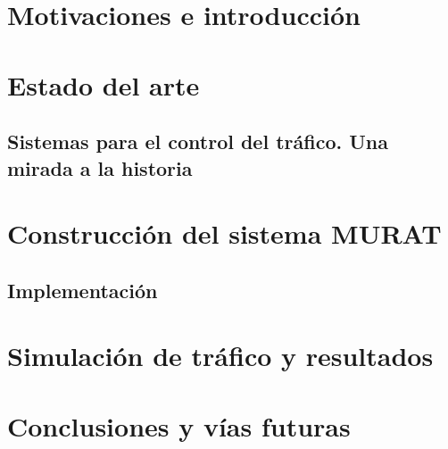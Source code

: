 \part{Motivaciones e introducción}
    \label{part:one}


\part{Estado del arte}
    \label{part:two}
\chapter{Sistemas para el control del tráfico. Una mirada a la historia}
    \label{chap:two}

\part{Construcción del sistema MURAT}
    \label{part:three}




\chapter{Implementación}
    \label{chap:five}


\part{Simulación de tráfico y resultados}
    \label{part:four}


\part{Conclusiones y vías futuras}
    \label{part:five}

